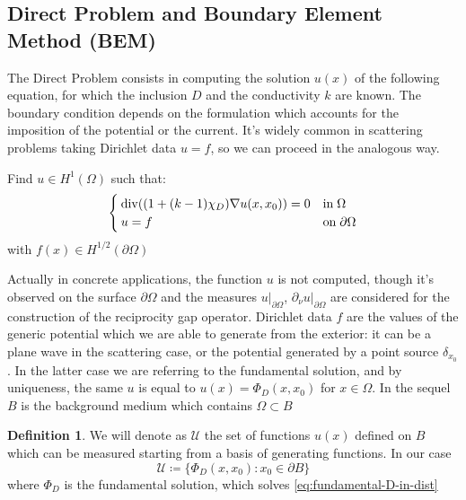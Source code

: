 \documentclass[10pt, a4paper, twoside, openright]{book}
\theoremstyle{definition}
\newtheorem{definition}[subsection]{Definition}
\theoremstyle{plain}
\theoremstyle{plain}
\theoremstyle{plain}
\theoremstyle{plain}
\theoremstyle{plain}
\theoremstyle{plain}
\theoremstyle{plain}
\theoremstyle{plain}
\DeclareMathOperator{\divergence}{div}
\begin{document}
\subsection{Direct Problem and Boundary Element Method (BEM)}
The Direct Problem consists in computing the solution $u(x)$ of the following equation, for which the inclusion $D$ and the conductivity $k$ are known. The boundary condition depends on the formulation which accounts for the imposition of the potential or the current. It's widely common in scattering problems taking Dirichlet data $u=f$, so we can proceed in the analogous way.
\begin{center}
\colorbox{light-gray}{\color{black}\parbox{\textwidth}{
Find $u \in H^1(\Omega)$ such that:
\begin{equation}
  \begin{cases}
  \divergence((1+(k-1)\chi_D)\nabla u(x,x_0)) = 0 & \textup{in}\;\Omega\\
  u = f & \textup{on}\;\partial\Omega
 \end{cases}
\end{equation}
with $f(x) \in H^{1/2}(\partial\Omega)$
}}
\end{center}
Actually in concrete applications, the function $u$ is not computed, though it's observed on the surface $\partial\Omega$ and the measures $u|_{\partial \Omega}$, $\partial_\nu u|_{\partial \Omega}$ are considered for the construction of the reciprocity gap operator. Dirichlet data $f$ are the values of the generic potential which we are able to generate from the exterior: it can be a plane wave in the scattering case, or the potential generated by a point source $\delta_{x_0}$. In the latter case we are referring to the fundamental solution, and by uniqueness, the same $u$ is equal to $u(x)=\Phi_D(x,x_0)$ for $x\in \Omega$.
In the sequel $B$ is the background medium which contains $\Omega\subset B$
\begin{definition}
\label{def:setU}
We will denote as $\mathcal{U}$ the set of functions $u(x)$ defined on $B$ which can be measured starting from a basis of generating functions.
In our case
\begin{equation}
 \mathcal{U}\coloneqq\bigl\{\Phi_D(x, x_0): x_0\in \partial B\bigr\}
\end{equation}
where $\Phi_D$ is the fundamental solution, which solves \ref{eq:fundamental-D-in-dist}
\end{definition}
\begin{center}
\end{center}
\end{document}
